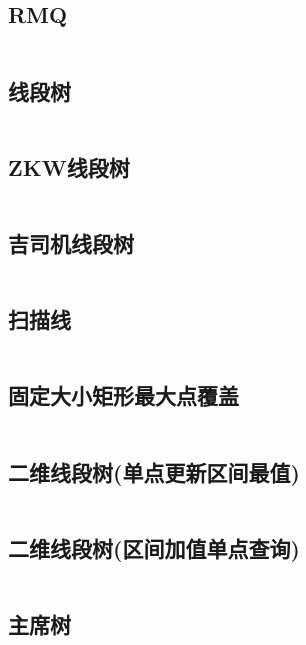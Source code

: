 \inputminted{cpp}{code/RMQ.cc}

\subsection{RMQ} 

\inputminted{cpp}{code/RMQ2.cc}

\subsection{线段树} 

\inputminted{cpp}{code/segmentTree.cc}

\subsection{ZKW线段树} 

\inputminted{cpp}{code/ZKW线段树.cc}

\subsection{吉司机线段树} 

\inputminted{cpp}{code/SegmentTreeBeats.cc}

\subsection{扫描线} 

\inputminted{cpp}{code/scanningLine.cc}

\subsection{固定大小矩形最大点覆盖} 

\inputminted{cpp}{code/linescanMaxSquareCover.cc}

\subsection{二维线段树(单点更新区间最值)} 

\inputminted{cpp}{code/2dsegtree1.cc}

\subsection{二维线段树(区间加值单点查询)} 

\inputminted{cpp}{code/2dsegtree2.cc}

\subsection{主席树} 

